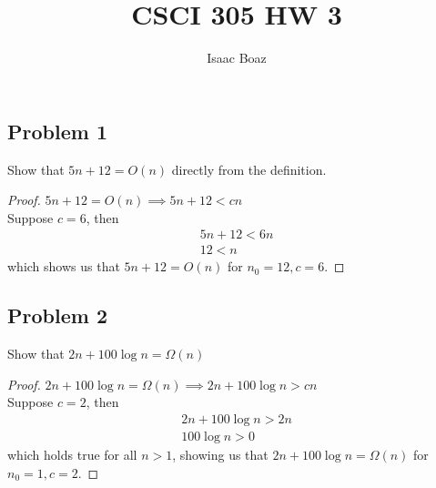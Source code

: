 \documentclass{article}
\title{CSCI 305 HW 3}
\author{Isaac Boaz}
\begin{document}
\maketitle

\subsection*{Problem 1}
Show that \(5n + 12 = O(n)\) directly from the definition.

\begin{proof}
    \(5n + 12 = O(n) \implies 5n + 12 < cn\) \\
    Suppose \(c = 6\), then
    \begin{align*}
        5n + 12 < 6n \\
        12 < n
    \end{align*}
    which shows us that \(5n + 12 = O(n)\) for \(n_0 = 12, c = 6\).
\end{proof}

\subsection*{Problem 2}
Show that \(2n + 100 \log n= \Omega(n)\)
\begin{proof}
    \(2n + 100 \log n = \Omega(n) \implies 2n + 100 \log n > cn\) \\
    Suppose \(c = 2\), then
    \begin{align*}
        2n + 100 \log n > 2n \\
        100 \log n > 0
    \end{align*}
    which holds true for all \(n > 1\), showing us that \(2n + 100 \log n = \Omega(n)\) for \(n_0=1,c=2\).
\end{proof}
\end{document}

